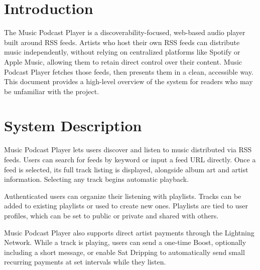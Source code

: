 \documentclass{article}
\begin{document}

\section{Introduction}
The Music Podcast Player is a discoverability-focused, web-based audio player built around RSS 
feeds. Artists who host their own RSS feeds can distribute music independently, without relying 
on centralized platforms like Spotify or Apple Music, allowing them to retain direct control 
over their content. Music Podcast Player fetches those feeds, then presents them in a clean, 
accessible way. This document provides a high-level overview of the system for readers 
who may be unfamiliar with the project.

\section{System Description}
Music Podcast Player lets users discover and listen to music distributed via RSS feeds. 
Users can search for feeds by keyword or input a feed URL directly. Once a feed is selected, 
its full track listing is displayed, alongside album art and artist information. Selecting 
any track begins automatic playback.

Authenticated users can organize their listening with playlists. Tracks can be added to 
existing playlists or used to create new ones. Playlists are tied to user profiles, which 
can be set to public or private and shared with others.

Music Podcast Player also supports direct artist payments through the Lightning Network. 
While a track is playing, users can send a one-time Boost, optionally including a short 
message, or enable Sat Dripping to automatically send small recurring payments at set 
intervals while they listen.
\end{document}
